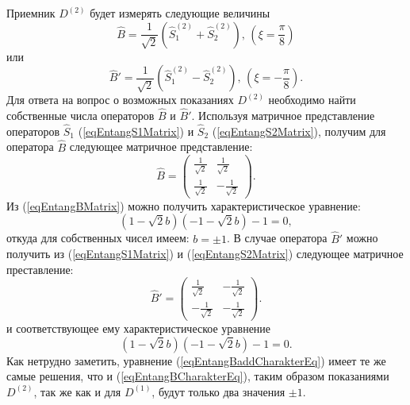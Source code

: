Приемник $D^{(2)}$ будет измерять следующие величины 
\[
\hat{B} = \frac{1}{\sqrt{2}}\left(\hat{S}_1^{(2)} + \hat{S}_2^{(2)}\right),\,(\xi =
\frac{\pi}{8}) 
\]
или 
\[
\hat{B}' = \frac{1}{\sqrt{2}}\left(\hat{S}_1^{(2)} - \hat{S}_2^{(2)}\right),\,(\xi =
- \frac{\pi}{8}).
\]
Для ответа на вопрос о возможных показаниях $D^{(2)}$ необходимо найти
собственные числа операторов $\hat{B}$ и $\hat{B}'$. Используя
матричное представление операторов $\hat{S}_1$
(\ref{eqEntangS1Matrix}) и $\hat{S}_2$ (\ref{eqEntangS2Matrix}),
получим для оператора $\hat{B}$ следующее матричное представление:
\begin{equation}
\hat{B} = 
\left(
\begin{array}{cc}
\frac{1}{\sqrt{2}} & \frac{1}{\sqrt{2}} \\
\frac{1}{\sqrt{2}} & -\frac{1}{\sqrt{2}} 
\end{array}
\right).
\label{eqEntangBMatrix}
\end{equation}
Из (\ref{eqEntangBMatrix}) можно получить характеристическое
уравнение:
\begin{equation}
\left(1 -\sqrt{2} b\right)\left(- 1 -\sqrt{2} b\right) -1 = 0,
\label{eqEntangBCharakterEq}
\end{equation}
откуда для собственных чисел имеем: $b = \pm 1$. В случае оператора
$\hat{B}'$  можно получить из (\ref{eqEntangS1Matrix}) и
(\ref{eqEntangS2Matrix}) следующее матричное преставление:
\begin{equation}
\hat{B}' = 
\left(
\begin{array}{cc}
\frac{1}{\sqrt{2}} & -\frac{1}{\sqrt{2}} \\
-\frac{1}{\sqrt{2}} & -\frac{1}{\sqrt{2}} 
\end{array}
\right).
\label{eqEntangBaddMatrix}
\end{equation}
и соответствующее ему характеристическое уравнение
\begin{equation}
\left(1 -\sqrt{2} b\right)\left(- 1 -\sqrt{2} b\right) -1 = 0.
\label{eqEntangBaddCharakterEq}
\end{equation}
Как нетрудно заметить, уравнение (\ref{eqEntangBaddCharakterEq}) имеет
те же самые решения, что и (\ref{eqEntangBCharakterEq}), таким образом
показаниями $D^{(2)}$, так же как и для $D^{(1)}$, будут только два
значения $\pm 1$.

